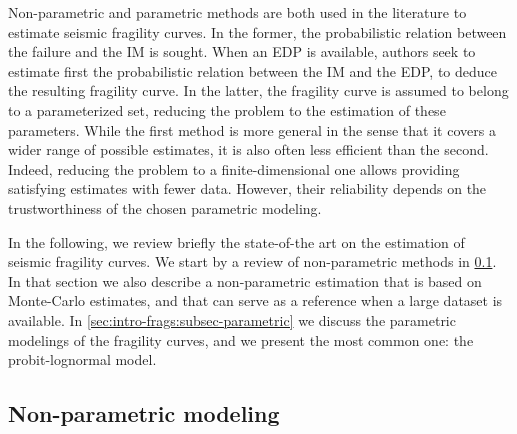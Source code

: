 Non-parametric and parametric methods are both used in the literature to estimate seismic fragility curves.
In the former, the probabilistic relation between the failure and the IM is sought. When an EDP is available, authors seek to estimate first the probabilistic relation between the IM and the EDP, to deduce the resulting fragility curve.
In the latter, the fragility curve is assumed to belong to a parameterized set, reducing the problem to the estimation of these parameters.
While the first method is more general in the sense that it covers a wider range of possible estimates, it is also often less efficient than the second. Indeed, reducing the problem to a finite-dimensional one allows providing satisfying estimates with fewer data. However, their reliability depends on the trustworthiness of the chosen parametric modeling.

In the following, we review briefly the
state-of-the art on the estimation of seismic fragility curves. We start by a review of non-parametric methods in \cref{sec:intro-frags:subsec-nonparametric}. In that section we also describe a non-parametric estimation that is based on Monte-Carlo estimates, and that can serve as a reference when a large dataset is available.
In \cref{sec:intro-frags:subsec-parametric} we discuss the parametric modelings of the fragility curves, and we present the most common one: the probit-lognormal model.



















\subsection{Non-parametric modeling}\label{sec:intro-frags:subsec-nonparametric}


